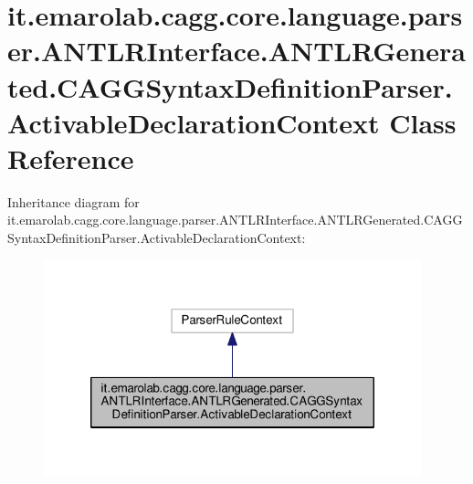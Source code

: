 \hypertarget{classit_1_1emarolab_1_1cagg_1_1core_1_1language_1_1parser_1_1ANTLRInterface_1_1ANTLRGenerated_1_93958287407dacaab89eed30e6774005}{\section{it.\-emarolab.\-cagg.\-core.\-language.\-parser.\-A\-N\-T\-L\-R\-Interface.\-A\-N\-T\-L\-R\-Generated.\-C\-A\-G\-G\-Syntax\-Definition\-Parser.\-Activable\-Declaration\-Context Class Reference}
\label{classit_1_1emarolab_1_1cagg_1_1core_1_1language_1_1parser_1_1ANTLRInterface_1_1ANTLRGenerated_1_93958287407dacaab89eed30e6774005}
}


Inheritance diagram for it.\-emarolab.\-cagg.\-core.\-language.\-parser.\-A\-N\-T\-L\-R\-Interface.\-A\-N\-T\-L\-R\-Generated.\-C\-A\-G\-G\-Syntax\-Definition\-Parser.\-Activable\-Declaration\-Context\-:
\nopagebreak
\begin{figure}[H]
\begin{center}
\leavevmode
\includegraphics[width=310pt]{classit_1_1emarolab_1_1cagg_1_1core_1_1language_1_1parser_1_1ANTLRInterface_1_1ANTLRGenerated_1_8fcadfeb2ac3a756a9d8b8fae2c87fec}
\end{center}
\end{figure}


